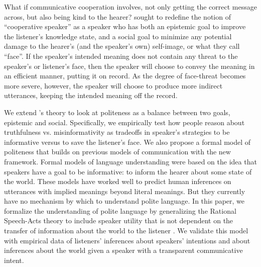 \documentclass[10pt,letterpaper]{article}
\newcommand{\ndg}[1]{\textcolor{Green}{[ndg: #1]}}
\begin{document}
What if communicative cooperation involves, not only getting the correct message across, but also being kind to the hearer? 
 sought to redefine the notion of ``cooperative speaker'' as a speaker 
who has both an epistemic goal to improve the listener's knowledge state, 
and a social goal to minimize any potential damage to the hearer's (and the speaker's own) self-image, or what they call ``face''.
If the speaker's intended meaning does not contain any threat to the speaker's or listener's face, 
then the speaker will choose to convey the meaning in an efficient manner, putting it on record. 
As the degree of face-threat becomes more severe, however, 
the speaker will choose to produce more indirect utterances, keeping the intended meaning off the record.

We extend 's theory to look at politeness as a balance between two goals, epistemic and social. 
Specifically, we empirically test how people reason about truthfulness vs. misinformativity 
as tradeoffs in speaker's strategies to be informative versus to save the listener's face. 
We also propose a formal model of politeness that builds on previous models of communication with the new framework.
Formal models of language understanding were based on the idea that
speakers have a goal to be informative: to inform the hearer about some state of the world.
These models have worked well to predict human inferences on utterances with implied meanings beyond literal meanings.
But they currently have no mechanism by which to understand polite language.
In this paper, we formalize the understanding of polite language by generalizing the Rational Speech-Acts theory 
to include speaker utility that is not dependent on the transfer of information about the world to the listener \cite{Frank2012, Goodman2013}.
We validate this model with empirical data of listeners' inferences about speakers' intentions and about inferences about the world given a speaker with a transparent communicative intent. 


\end{document}
